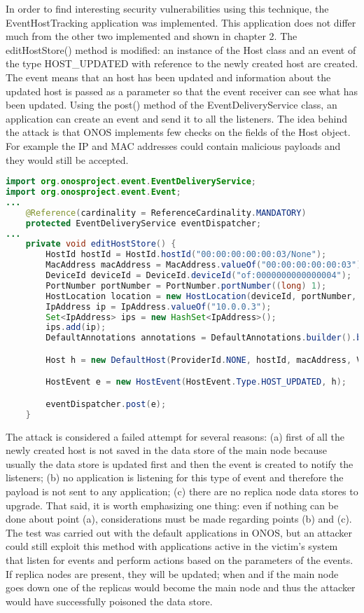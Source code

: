 \documentclass[a4paper,10pt]{memoir}
\begin{document}
In order to find interesting security vulnerabilities using this technique, the EventHostTracking application was implemented. This application does not differ much from the other two implemented and shown in chapter 2. The editHostStore() method is modified: an instance of the Host class and an event of the type HOST\_UPDATED with reference to the newly created host are created. The event means that an host has been updated and information about the updated host is passed as a parameter so that the event receiver can see what has been updated. Using the post() method of the EventDeliveryService class, an application can create an event and send it to all the listeners. The idea behind the attack is that ONOS implements few checks on the fields of the Host object. For example the IP and MAC addresses could contain malicious payloads and they would still be accepted.
\begin{lstlisting}[language=Java]
import org.onosproject.event.EventDeliveryService;
import org.onosproject.event.Event;
...
    @Reference(cardinality = ReferenceCardinality.MANDATORY)
    protected EventDeliveryService eventDispatcher;
...
    private void editHostStore() {
        HostId hostId = HostId.hostId("00:00:00:00:00:03/None");
        MacAddress macAddress = MacAddress.valueOf("00:00:00:00:00:03");
        DeviceId deviceId = DeviceId.deviceId("of:0000000000000004");
        PortNumber portNumber = PortNumber.portNumber((long) 1);
        HostLocation location = new HostLocation(deviceId, portNumber, (long) 1);
        IpAddress ip = IpAddress.valueOf("10.0.0.3");
        Set<IpAddress> ips = new HashSet<IpAddress>();
        ips.add(ip);
        DefaultAnnotations annotations = DefaultAnnotations.builder().build();

        Host h = new DefaultHost(ProviderId.NONE, hostId, macAddress, VlanId.NONE, location, ips, annotations);

        HostEvent e = new HostEvent(HostEvent.Type.HOST_UPDATED, h);

        eventDispatcher.post(e);
    }
\end{lstlisting}
The attack is considered a failed attempt for several reasons: (a) first of all the newly created host is not saved in the data store of the main node because usually the data store is updated first and then the event is created to notify the listeners; (b) no application is listening for this type of event and therefore the payload is not sent to any application; (c) there are no replica node data stores to upgrade. That said, it is worth emphasizing one thing: even if nothing can be done about point (a), considerations must be made regarding points (b) and (c). The test was carried out with the default applications in ONOS, but an attacker could still exploit this method with applications active in the victim's system that listen for events and perform actions based on the parameters of the events. If replica nodes are present, they will be updated; when and if the main node goes down one of the replicas would become the main node and thus the attacker would have successfully poisoned the data store.
\end{document}
